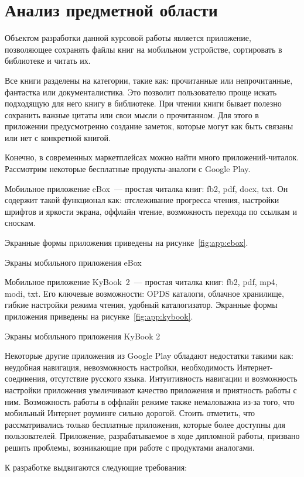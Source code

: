 \section{Анализ предметной области}
Объектом разработки данной курсовой работы является приложение,
позволяющее сохранять файлы книг на мобильном устройстве, сортировать в
библиотеке и читать их.\par
Все книги разделены на категории, такие как: прочитанные или
непрочитанные, фантастка или документалистика. Это позволит пользователю
проще искать подходящую для него книгу в библиотеке. При чтении книги
бывает полезно сохранить важные цитаты или свои мысли о прочитанном.
Для этого в приложении предусмотренно создание заметок, которые могут
как быть связаны или нет с конкретной книгой.\par
Конечно, в современных маркетплейсах можно найти много
приложений-читалок. Рассмотрим некоторые бесплатные продукты-аналоги
с Google Play.\par
Мобильное приложение eBox~--- простая читалка книг: fb2, pdf, docx, txt.
Он содержит такой функционал как: отслеживание прогресса чтения,
настройки шрифтов и яркости экрана, оффлайн чтение, возможность перехода
по ссылкам и сноскам.\par
Экранные формы приложения приведены на рисунке~\ref{fig:app:ebox}.

\begin{image}
	\caption{Экраны мобильного приложения eBox}
	\label{fig:app:ebox}
\end{image}

Мобильное приложение KyBook~2~--- простая читалка книг: fb2, pdf, mp4,
modi, txt. Его ключевые возможности: OPDS каталоги, облачное хранилище,
гибкие настройки режима чтения, удобный каталогизатор. Экранные формы
приложения приведены на рисунке~\ref{fig:app:kybook}.

\begin{image}
	\caption{Экраны мобильного приложения KyBook 2}
	\label{fig:app:kybook}
\end{image}

Некоторые другие приложения из Google Play обладают недостатки
такими как: неудобная навигация, невозможность настройки, необходимость
Интернет-соединения, отсутствие русского языка. Интуитивность навигации
и возможность настройки приложения увеличивают качество приложения и
приятность работы с ним. Возможность работы в оффлайн режиме также
немаловажна из-за того, что мобильный Интернет роуминге сильно дорогой.
Стоить отметить, что рассматривались только бесплатные приложения,
которые более доступны для пользователей. Приложение, разрабатываемое в
ходе дипломной работы, призвано решить проблемы, возникающие при
работе с продуктами аналогами.\par
К разработке выдвигаются следующие требования:


